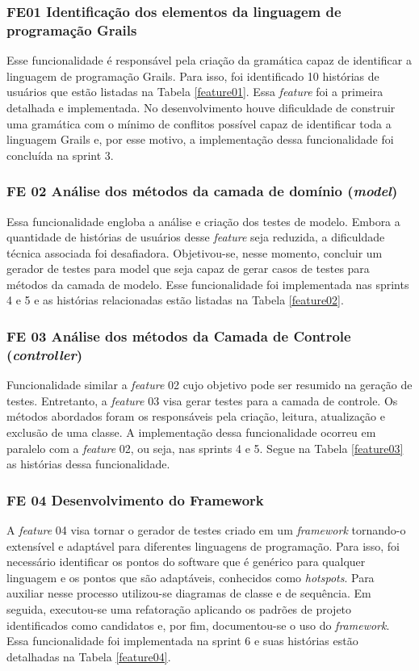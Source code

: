 \subsubsection{FE01 Identificação dos elementos da linguagem de programação Grails}
Esse funcionalidade é responsável pela criação da gramática capaz de identificar a linguagem de programação Grails. Para isso, foi identificado 10 histórias de usuários que estão listadas na Tabela \ref{feature01}. Essa \textit{feature} foi a primeira detalhada e implementada. No desenvolvimento houve dificuldade de construir uma gramática com o mínimo de conflitos possível capaz de identificar toda a linguagem Grails e, por esse motivo, a implementação dessa funcionalidade foi concluída na sprint 3.

\subsubsection{FE 02 Análise dos métodos da camada de domínio (\textit{model})}
Essa funcionalidade engloba a análise e criação dos testes de modelo. Embora a quantidade de histórias de usuários desse \textit{feature} seja reduzida, a dificuldade técnica associada foi desafiadora. Objetivou-se, nesse momento, concluir um gerador de testes para model que seja capaz de gerar casos de testes para métodos da camada de modelo. Esse funcionalidade foi implementada nas sprints 4 e 5 e as histórias relacionadas estão listadas na Tabela \ref{feature02}.

\subsubsection{FE 03 Análise dos métodos da Camada de Controle (\textit{controller})}
Funcionalidade similar a \textit{feature} 02 cujo objetivo pode ser resumido na geração de testes. Entretanto, a \textit{feature} 03 visa gerar testes para a camada de controle. Os métodos abordados foram os responsáveis pela criação, leitura, atualização e exclusão de uma classe. A implementação dessa funcionalidade ocorreu em paralelo com a \textit{feature} 02, ou seja, nas sprints 4 e 5. Segue na Tabela \ref{feature03} as histórias dessa funcionalidade.

\subsubsection{FE 04 Desenvolvimento do Framework}
A \textit{feature} 04 visa tornar o gerador de testes criado em um \textit{framework} tornando-o extensível e adaptável para diferentes linguagens de programação. Para isso, foi necessário identificar os pontos do software que é genérico para qualquer linguagem e os pontos que são adaptáveis, conhecidos como \textit{hotspots}. Para auxiliar nesse processo utilizou-se diagramas de classe e de sequência. Em seguida, executou-se uma refatoração aplicando os padrões de projeto identificados como candidatos e, por fim, documentou-se o uso do \textit{framework}. Essa funcionalidade foi implementada na sprint 6 e suas histórias estão detalhadas na Tabela \ref{feature04}.

